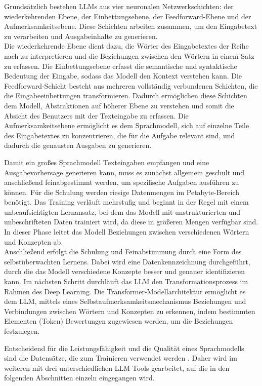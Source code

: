 Grundsätzlich bestehen LLMs aus vier neuronalen Netzwerkschichten: der wiederkehrenden Ebene, der Einbettungsebene, 
der Feedforward-Ebene und der Aufmerksamkeitsebene. Diese Schichten arbeiten zusammen, um den Eingabetext zu 
verarbeiten und Ausgabeinhalte zu generieren.\\
Die wiederkehrende Ebene dient dazu, die Wörter des Eingabetextes der Reihe nach zu interpretieren und die 
Beziehungen zwischen den Wörtern in einem Satz zu erfassen. Die Einbettungsebene erfasst die semantische und 
syntaktische Bedeutung der Eingabe, sodass das Modell den Kontext verstehen kann. Die Feedforward-Schicht besteht 
aus mehreren vollständig verbundenen Schichten, die die Eingabeeinbettungen transformieren. Dadurch ermöglichen 
diese Schichten dem Modell, Abstraktionen auf höherer Ebene zu verstehen und somit die Absicht des Benutzers mit 
der Texteingabe zu erfassen. Die Aufmerksamkeitsebene ermöglicht es dem Sprachmodell, sich auf einzelne Teile des 
Eingabetextes zu konzentrieren, die für die Aufgabe relevant sind, und dadurch die genausten Ausgaben zu generieren.

Damit ein großes Sprachmodell Texteingaben empfangen und eine Ausgabevorhersage generieren kann, muss es zunächst 
allgemein geschult und anschließend feinabgestimmt werden, um spezifische Aufgaben ausführen zu können. Für die 
Schulung werden riesige Datenmengen im Petabyte-Bereich benötigt. Das Training verläuft mehrstufig und beginnt 
in der Regel mit einem unbeaufsichtigten Lernansatz, bei dem das Modell mit unstrukturierten und unbeschrifteten 
Daten trainiert wird, da diese in größeren Mengen verfügbar sind. In dieser Phase leitet das Modell Beziehungen 
zwischen verschiedenen Wörtern und Konzepten ab.\\
Anschließend erfolgt die Schulung und Feinabstimmung durch eine Form des selbstüberwachten Lernens. Dabei wird 
eine Datenkennzeichnung durchgeführt, durch die das Modell verschiedene Konzepte besser und genauer identifizieren 
kann. Im nächsten Schritt durchläuft das LLM den Transformationsprozess im Rahmen des Deep Learning. Die 
Transformer-Modellarchitektur ermöglicht es dem LLM, mittels eines Selbstaufmerksamkeitsmechanismus Beziehungen 
und Verbindungen zwischen Wörtern und Konzepten zu erkennen, indem bestimmten Elementen (Token) Bewertungen 
zugewiesen werden, um die Beziehungen festzulegen.


Entscheidend für die Leistungsfähigkeit und die Qualität eines Sprachmodells sind die Datensätze, die zum 
Trainieren verwendet werden \cite{GrundlagenLLM}. Daher wird im weiteren mit drei unterschiedlichen LLM Tools gearbeitet, auf die 
in den folgenden Abschnitten einzeln eingegangen wird. 

